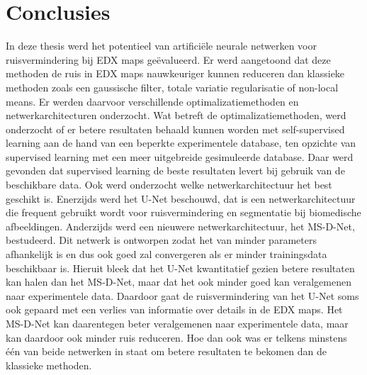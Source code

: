\documentclass{report}
\begin{document}
\chapter{Conclusies} \label{ch:discussion}
In deze thesis werd het potentieel van artificiële neurale netwerken voor ruisvermindering bij EDX maps geëvalueerd. Er werd aangetoond dat deze methoden de ruis in EDX maps nauwkeuriger kunnen reduceren dan klassieke methoden zoals een gaussische filter, totale variatie regularisatie of non-local means. Er werden daarvoor verschillende optimalizatiemethoden en netwerkarchitecturen onderzocht. Wat betreft de optimalizatiemethoden, werd onderzocht of er betere resultaten behaald kunnen worden met self-supervised learning aan de hand van een beperkte experimentele database, ten opzichte van supervised learning met een meer uitgebreide gesimuleerde database. Daar werd gevonden dat supervised learning de beste resultaten levert bij gebruik van de beschikbare data. Ook werd onderzocht welke netwerkarchitectuur het best geschikt is. Enerzijds werd het U-Net beschouwd, dat is een netwerkarchitectuur die frequent gebruikt wordt voor ruisvermindering en segmentatie bij biomedische afbeeldingen. Anderzijds werd een nieuwere netwerkarchitectuur, het MS-D-Net, bestudeerd. Dit netwerk is ontworpen zodat het van minder parameters afhankelijk is en dus ook goed zal convergeren als er minder trainingsdata beschikbaar is. Hieruit bleek dat het U-Net kwantitatief gezien betere resultaten kan halen dan het MS-D-Net, maar dat het ook minder goed kan veralgemenen naar experimentele data. Daardoor gaat de ruisvermindering van het U-Net soms ook gepaard met een verlies van informatie over details in de EDX maps. Het MS-D-Net kan daarentegen beter veralgemenen naar experimentele data, maar kan daardoor ook minder ruis reduceren. Hoe dan ook was er telkens minstens één van beide netwerken in staat om betere resultaten te bekomen dan de klassieke methoden.
\\ \\
\end{document}
